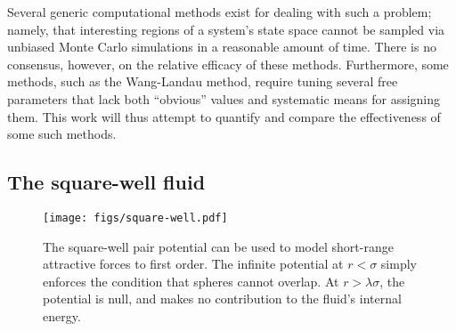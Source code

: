 \documentclass[11pt]{article}
\begin{document}
Several generic computational methods exist for dealing with such a
problem; namely, that interesting regions of a system's state space
cannot be sampled via unbiased Monte Carlo simulations in a reasonable
amount of time. There is no consensus, however, on the relative
efficacy of these methods. Furthermore, some methods, such as the
Wang-Landau method\cite{wang_landau}, require tuning several free
parameters that lack both ``obvious'' values and systematic means for
assigning them. This work will thus attempt to quantify and compare
the effectiveness of some such methods.

\subsection{The square-well fluid}
\label{sec:sw_fluid}

\begin{figure}[!b]
  \centering
  \texttt{[image: figs/square-well.pdf]}
  \caption[The square-well pair potential]{The square-well pair
    potential can be used to model short-range attractive forces to
    first order. The infinite potential at $r<\sigma$ simply enforces
    the condition that spheres cannot overlap. At $r>\lambda\sigma$,
    the potential is null, and makes no contribution to the fluid's
    internal energy.}
  \label{fig:pair_potential}
\end{figure}
\end{document}
